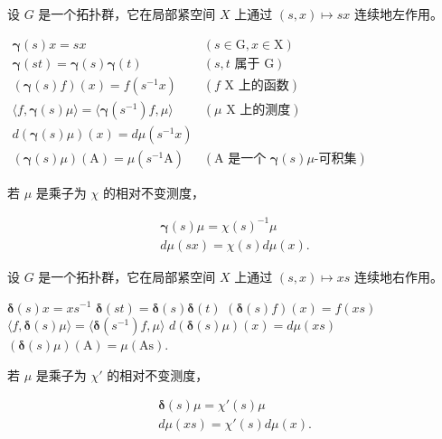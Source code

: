 
设 \(G\) 是一个拓扑群，它在局部紧空间 \(X\) 上通过 \((s, x) \mapsto sx\) 连续地左作用。

\(\begin{array}{ll}\pmb {\gamma}(s)x = sx & (s\in \mathrm{G},x\in \mathrm{X})\\ \pmb {\gamma}(st) = \pmb {\gamma}(s)\pmb {\gamma}(t) & (s,t\text{ 属于 G})\\ (\pmb {\gamma}(s)f)(x) = f(s^{-1}x) & (f\text{ X 上的函数})\\ \langle f,\pmb {\gamma}(s)\mu \rangle = \langle \pmb {\gamma}(s^{-1})f,\mu \rangle & (\mu \text{ X 上的测度})\\ d(\pmb {\gamma}(s)\mu)(x) = d\mu (s^{-1}x)\\ (\pmb {\gamma}(s)\mu)(\mathrm{A}) = \mu (s^{-1}\mathrm{A}) & (\mathrm{A}\text{ 是一个 }\pmb {\gamma}(s)\mu \text{-可积集}) \end{array}\)

若 \(\mu\) 是乘子为 \(\chi\) 的相对不变测度，

\[
\begin{array}{l} \pmb {\gamma} (s) \mu = \chi (s) ^ {- 1} \mu \\ d \mu (s x) = \chi (s) d \mu (x). \end{array}
\]

设 \(G\) 是一个拓扑群，它在局部紧空间 \(X\) 上通过 \((s, x) \mapsto xs\) 连续地右作用。

\(\pmb {\delta}(s)x = xs^{-1}\) \(\pmb {\delta}(st) = \pmb {\delta}(s)\pmb {\delta}(t)\) \((\pmb {\delta}(s)f)(x) = f(xs)\) \(\langle f,\pmb {\delta}(s)\mu \rangle = \langle \pmb {\delta}(s^{-1})f,\mu \rangle\) \(d(\pmb {\delta}(s)\mu)(x) = d\mu (xs)\) \((\pmb {\delta}(s)\mu)(\mathrm{A}) = \mu (\mathrm{As}).\)

若 \(\mu\) 是乘子为 \(\chi'\) 的相对不变测度，

\[
\begin{array}{l} \pmb {\delta} (s) \mu = \chi' (s) \mu \\ d \mu (x s) = \chi' (s) d \mu (x). \end{array}
\]

